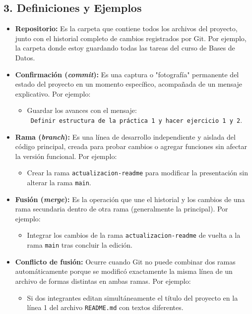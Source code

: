 \documentclass[12pt,letterpaper]{article}
\begin{document}
\subsection*{3. Definiciones y Ejemplos}
\begin{itemize}
    \item \textbf{Repositorio:} Es la carpeta que contiene todos los archivos del proyecto, junto con el historial completo de cambios registrados por Git. Por ejemplo, la carpeta donde estoy guardando todas las tareas del curso de Bases de Datos.

    \item \textbf{Confirmación (\textit{commit}):} Es una captura o "fotografía" permanente del estado del proyecto en un momento específico, acompañada de un mensaje explicativo. Por ejemplo:
    \begin{itemize}
        \item Guardar los avances con el mensaje:\\ \texttt{ Definir estructura de la práctica 1 y hacer ejercicio 1 y 2}.
    \end{itemize}

    \item \textbf{Rama (\textit{branch}):} Es una línea de desarrollo independiente y aislada del código principal, creada para probar cambios o agregar funciones sin afectar la versión funcional. Por ejemplo:
    \begin{itemize}
        \item Crear la rama \texttt{actualizacion-readme} para modificar la presentación sin alterar la rama \texttt{main}.
    \end{itemize}

    \item \textbf{Fusión (\textit{merge}):} Es la operación que une el historial y los cambios de una rama secundaria dentro de otra rama (generalmente la principal). Por ejemplo:
    \begin{itemize}
        \item Integrar los cambios de la rama \texttt{actualizacion-readme} de vuelta a la rama \texttt{main} tras concluir la edición.
    \end{itemize}

    \item \textbf{Conflicto de fusión:} Ocurre cuando Git no puede combinar dos ramas automáticamente porque se modificó exactamente la misma línea de un archivo de formas distintas en ambas ramas. Por ejemplo:
    \begin{itemize}
        \item Si dos integrantes editan simultáneamente el título del proyecto en la línea 1 del archivo \texttt{README.md} con textos diferentes.
    \end{itemize}


\end{itemize}
\end{document}
